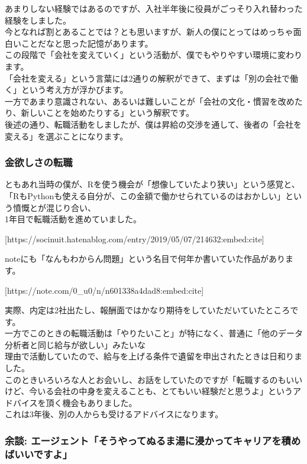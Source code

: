 \documentclass[
  letterpaper,
  DIV=11,
  numbers=noendperiod]{scrartcl}
\begin{document}
あまりしない経験ではあるのですが、入社半年後に役員がごっそり入れ替わった経験をしました。\\
今となれば割とあることでは？とも思いますが、新人の僕にとってはめっちゃ面白いことだなと思った記憶があります。\\
この段階で「会社を変えていく」という活動が、僕でもやりやすい環境に変わります。\\
「会社を変える」という言葉には2通りの解釈ができて、まずは「別の会社で働く」という考え方が浮かびます。\\
一方であまり意識されない、あるいは難しいことが「会社の文化・慣習を改めたり、新しいことを始めたりする」という解釈です。\\
後述の通り、転職活動をしましたが、僕は昇給の交渉を通して、後者の「会社を変える」を選ぶことになります。

\hypertarget{ux91d1ux6b32ux3057ux3055ux306eux8ee2ux8077}{%
\subsubsection{金欲しさの転職}\label{ux91d1ux6b32ux3057ux3055ux306eux8ee2ux8077}}

ともあれ当時の僕が、Rを使う機会が「想像していたより狭い」という感覚と、\\
「RもPythonも使える自分が、この金額で働かせられているのはおかしい」という憤慨とが混じり合い、\\
1年目で転職活動を進めていました。

{[}https://socinuit.hatenablog.com/entry/2019/05/07/214632:embed:cite{]}

noteにも「なんもわからん問題」という名目で何年か書いていた作品があります。

{[}https://note.com/0\_u0/n/n601338a4dad8:embed:cite{]}

実際、内定は2社出たし、報酬面ではかなり期待をしていただいていたところです。\\
一方でこのときの転職活動は「やりたいこと」が特になく、普通に「他のデータ分析者と同じ給与が欲しい」みたいな\\
理由で活動していたので、給与を上げる条件で遺留を申出されたときは日和りました。\\
このときいろいろな人とお会いし、お話をしていたのですが「転職するのもいいけど、今いる会社の中身を変えることも、とてもいい経験だと思うよ」というアドバイスを頂く機会もありました。\\
これは3年後、別の人からも受けるアドバイスになります。

\hypertarget{ux4f59ux8ac7-ux30a8ux30fcux30b8ux30a7ux30f3ux30c8ux305dux3046ux3084ux3063ux3066ux306cux308bux307eux6e6fux306bux6d78ux304bux3063ux3066ux30adux30e3ux30eaux30a2ux3092ux7a4dux3081ux3070ux3044ux3044ux3067ux3059ux3088}{%
\subsubsection{余談:
エージェント「そうやってぬるま湯に浸かってキャリアを積めばいいですよ」}\label{ux4f59ux8ac7-ux30a8ux30fcux30b8ux30a7ux30f3ux30c8ux305dux3046ux3084ux3063ux3066ux306cux308bux307eux6e6fux306bux6d78ux304bux3063ux3066ux30adux30e3ux30eaux30a2ux3092ux7a4dux3081ux3070ux3044ux3044ux3067ux3059ux3088}}
\end{document}
